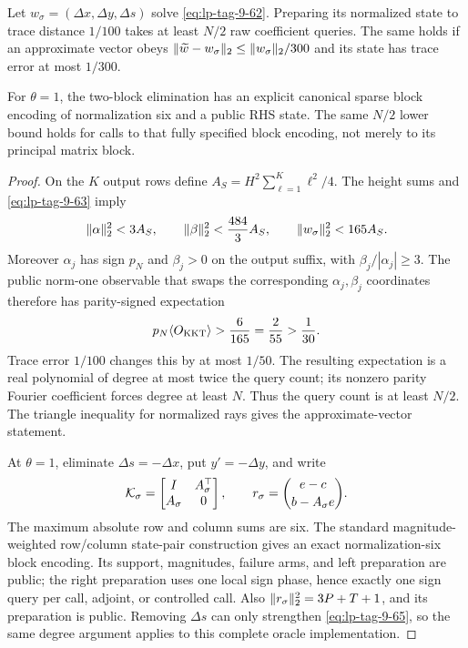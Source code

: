 \begin{theorem}
\label{thm:lp-full-kkt}
Let \(w_\sigma=(\Delta x,\Delta y,\Delta s)\) solve \eqref{eq:lp-tag-9-62}.
Preparing its
normalized state to trace distance \(1/100\) takes at least \(N/2\) raw
coefficient queries.  The same holds if an approximate vector obeys
\(\lVert\widetilde w-w_\sigma\rVert_2\leq\lVert w_\sigma\rVert_2/300\) and its state
has trace error at most \(1/300\).

For \(\theta=1\), the two-block elimination has an explicit canonical sparse
block encoding of normalization six and a public RHS state.  The same
\(N/2\) lower bound holds for calls to that fully specified block encoding,
not merely to its principal matrix block.
\end{theorem}

\begin{proof}
On the \(K\) output rows define
\(A_S=H^2\sum_{\ell=1}^K\ell^2/4\).  The height sums and
\eqref{eq:lp-tag-9-63} imply
\begin{equation}
 \lVert\alpha\rVert_2^2<3A_S,\qquad
 \lVert\beta\rVert_2^2<\frac{484}{3}A_S,\qquad
 \lVert w_\sigma\rVert_2^2<165A_S.
\end{equation}
Moreover \(\alpha_j\) has sign \(p_N\) and \(\beta_j>0\) on the output
suffix, with \(\beta_j/|\alpha_j|\geq3\).  The public norm-one observable
that swaps the corresponding \(\alpha_j,\beta_j\) coordinates therefore has
parity-signed expectation
\begin{equation}
 p_N\langle O_{\rm KKT}\rangle>\frac6{165}=\frac2{55}>\frac1{30}.
\label{eq:lp-tag-9-65}
\end{equation}
Trace error \(1/100\) changes this by at most \(1/50\).  The resulting
expectation is a real polynomial of degree at most twice the query count; its
nonzero parity Fourier coefficient forces degree at least \(N\).  Thus the
query count is at least \(N/2\).  The triangle inequality for normalized
rays gives the approximate-vector statement.

At \(\theta=1\), eliminate \(\Delta s=-\Delta x\), put \(y'=-\Delta y\),
and write
\begin{equation}
 {\cal K}_\sigma=\begin{bmatrix}I&A_\sigma^\top\\A_\sigma&0\end{bmatrix},
 \qquad
 r_\sigma=\binom{e-c}{b-A_\sigma e}.
\end{equation}
The maximum absolute row and column sums are six.  The standard
magnitude-weighted row/column state-pair construction gives an exact normalization-six
block encoding.  Its support, magnitudes, failure arms, and left preparation
are public; the right preparation uses one local sign phase, hence exactly
one sign query per call, adjoint, or controlled call.  Also
\(\lVert r_\sigma\rVert_2^2=3P+T+1\), and its preparation is public.  Removing
\(\Delta s\) can only strengthen \eqref{eq:lp-tag-9-65}, so the same degree argument applies
to this complete oracle implementation.
\end{proof}

